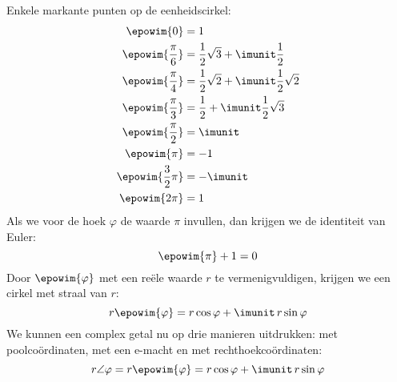 Enkele markante punten op de eenheidscirkel:
%
\begin{equation}
\begin{split}
\epowim{0} &= 1 \\
\epowim{\frac{\pi}{6}} &= \frac{1}{2}\sqrt{3} + \imunit\frac{1}{2}\\
\epowim{\frac{\pi}{4}} &= \frac{1}{2}\sqrt{2} + \imunit\frac{1}{2}\sqrt{2}\\
\epowim{\frac{\pi}{3}} &= \frac{1}{2} + \imunit\frac{1}{2}\sqrt{3}\\
\epowim{\frac{\pi}{2}} &= \imunit \\
\epowim{\pi} &= -1 \\
\epowim{\frac{3}{2}\pi} &= -\imunit \\
\epowim{2\pi} &= 1 \\
\end{split}
\end{equation}
%
%
Als we voor de hoek $\varphi$ de waarde $\pi$ invullen, dan krijgen we de identiteit van Euler:
%
\begin{equation}
\epowim{\pi} + 1 = 0
\end{equation}Door $\epowim{\varphi}$ met een reële waarde $r$ te vermenigvuldigen, krijgen we een cirkel met straal van $r$:
%
\begin{equation}
r\epowim{\varphi} = r\cos\varphi + \imunit\, r\sin\varphi
\end{equation}
%
We kunnen een complex getal nu op drie manieren uitdrukken: met poolcoördinaten, met een e-macht en met rechthoekcoördinaten:
%
\begin{equation}
r\angle\varphi = r\epowim{\varphi} = r\cos\varphi + \imunit\, r\sin\varphi
\end{equation}
